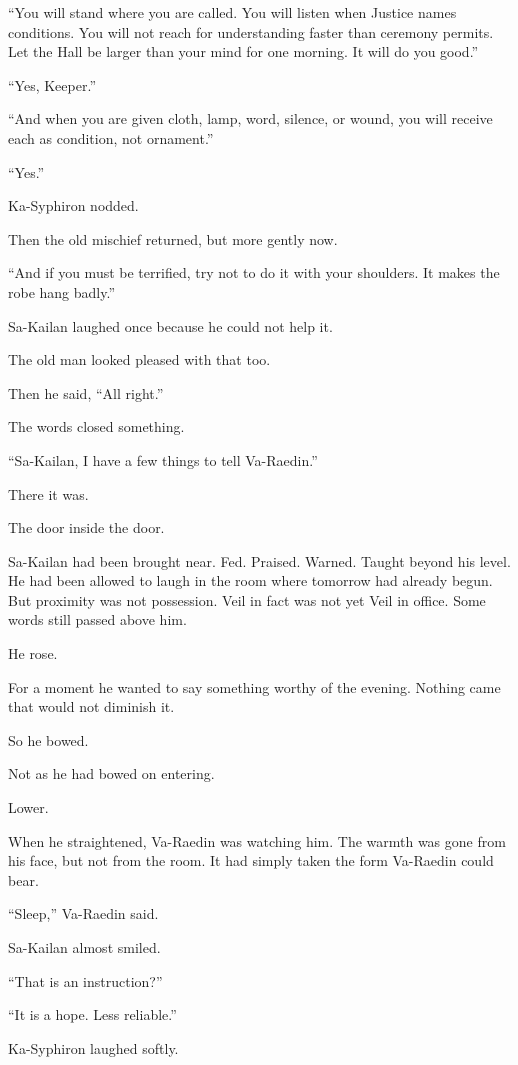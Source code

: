 “You will stand where you are called. You will listen when Justice names conditions. You will not reach for understanding faster than ceremony permits. Let the Hall be larger than your mind for one morning. It will do you good.”\par
“Yes, Keeper.”\par
“And when you are given cloth, lamp, word, silence, or wound, you will receive each as condition, not ornament.”\par
“Yes.”\par
Ka-Syphiron nodded.\par
Then the old mischief returned, but more gently now.\par
“And if you must be terrified, try not to do it with your shoulders. It makes the robe hang badly.”\par
Sa-Kailan laughed once because he could not help it.\par
The old man looked pleased with that too.\par
Then he said, “All right.”\par
The words closed something.\par
“Sa-Kailan, I have a few things to tell Va-Raedin.”\par
There it was.\par
The door inside the door.\par
Sa-Kailan had been brought near. Fed. Praised. Warned. Taught beyond his level. He had been allowed to laugh in the room where tomorrow had already begun. But proximity was not possession. Veil in fact was not yet Veil in office. Some words still passed above him.\par
He rose.\par
For a moment he wanted to say something worthy of the evening. Nothing came that would not diminish it.\par
So he bowed.\par
Not as he had bowed on entering.\par
Lower.\par
When he straightened, Va-Raedin was watching him. The warmth was gone from his face, but not from the room. It had simply taken the form Va-Raedin could bear.\par
“Sleep,” Va-Raedin said.\par
Sa-Kailan almost smiled.\par
“That is an instruction?”\par
“It is a hope. Less reliable.”\par
Ka-Syphiron laughed softly.\par
